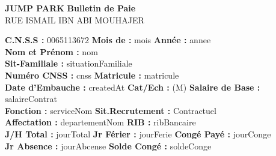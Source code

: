 \documentclass[a4paper,landscape]{article}
\begin{document}
\begin{minipage}{0.48\linewidth} %
        \noindent
\textbf{JUMP PARK}\hfill
\textbf{Bulletin de Paie} \\[0.25cm]
RUE ISMAIL IBN ABI MOUHAJER


\noindent
\textbf{C.N.S.S :} {0065113672} \hfill \textbf{Mois de :} {{ mois }} \hfill \textbf{Année :} {{ annee }}\\[0.2cm]


\noindent
\noindent
\textbf{Nom et Prénom :} {{ nom }}\\[0.1cm]
\textbf{Sit-Familiale :} {{ situationFamiliale }}\\[0.1cm]
\textbf{Numéro CNSS :} {{ cnss }} \hfill \textbf{Matricule :} {{ matricule }}\\[0.1cm]
\textbf{Date d'Embauche :} {{ createdAt }} \hfill 
\textbf{Cat/Ech :} (M) \hfill 
\textbf{Salaire de Base :} {{ salaireContrat }}\\[0.1cm]
\textbf{Fonction :} {{ serviceNom }} \hfill 
\textbf{Sit.Recrutement :} Contractuel\\[0.1cm]
\textbf{Affectation :} {{ departementNom }} \hfill 
\textbf{RIB :} {{ ribBancaire }}\\[0.1cm]
\textbf{J/H Total :} {{ jourTotal }} \hfill
\textbf{Jr Férier :} {{ jourFerie }} \hfill
\textbf{Congé Payé :} {{ jourConge }}\\[0.1cm]
\textbf{Jr Absence :} {{ jourAbcense }} \hfill
\textbf{Solde Congé :} {{ soldeConge }}




\end{minipage}
\end{document}
